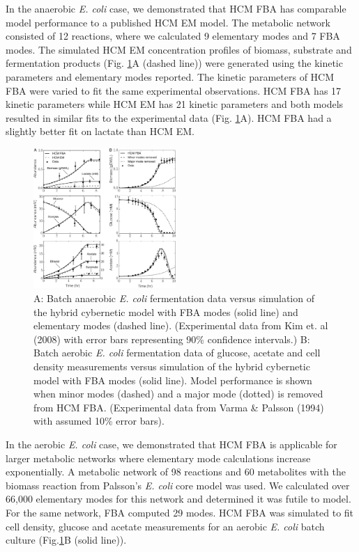 \documentclass[10pt,twocolumn,twoside,final]{IEEEtran}
\begin{document}
In the anaerobic \textit{E. coli} case, we demonstrated that HCM FBA has comparable model performance to a published HCM EM model\cite{2008_kim_varner_ramkrishna_BiotechProg}.
The metabolic network consisted of 12 reactions, where we calculated 9 elementary modes and 7 FBA modes.
The simulated HCM EM concentration profiles of biomass, substrate and fermentation products (Fig. \ref {fig:ecoli}A (dashed line)) were generated using the kinetic parameters and elementary modes reported\cite{2008_kim_varner_ramkrishna_BiotechProg}. 
The kinetic parameters of HCM FBA were varied to fit the same experimental observations.
HCM FBA has 17 kinetic parameters while HCM EM has 21 kinetic parameters and both models resulted in similar fits to the experimental data (Fig. \ref {fig:ecoli}A).
HCM FBA had a slightly better fit on lactate than HCM EM. 

\begin{figure}[!t]\centering
\includegraphics[width=0.48\textwidth]{./figs/Fig-2-Ecoli-SimulationResults.pdf}
\caption{A: Batch anaerobic \textit{E. coli} fermentation data versus simulation of the hybrid cybernetic model with FBA modes (solid line) and elementary modes (dashed line). (Experimental data from Kim et. al (2008)\cite{2008_kim_varner_ramkrishna_BiotechProg} with error bars representing 90\% confidence intervals.) B: Batch aerobic \textit{E. coli} fermentation data of glucose, acetate and cell density measurements versus simulation of the hybrid cybernetic model with FBA modes (solid line). Model performance is shown when minor modes (dashed) and a major mode (dotted) is removed from HCM FBA. (Experimental data from Varma \& Palsson (1994)\cite{1994_varma_palsson_ApplEnvMicro} with assumed 10\% error bars).}
\label{fig:ecoli}
\end{figure} 

In the aerobic \textit{E. coli} case, we demonstrated that HCM FBA is applicable for larger metabolic networks where elementary mode calculations increase exponentially.
A metabolic network\cite{2007_schuetz_etal_MolSysBio} of 98 reactions and 60 metabolites with the biomass reaction from Palsson's \textit{E. coli} core model\cite{2006_Palsson_model} was used.
We calculated over 66,000 elementary modes for this network and determined it was futile to model. 
For the same network, FBA computed 29 modes. 
HCM FBA was simulated to fit cell density, glucose and acetate measurements for an aerobic \textit{E. coli} batch culture\cite{1994_varma_palsson_ApplEnvMicro} (Fig.\ref{fig:ecoli}B (solid line)). 
 
\end{document}

